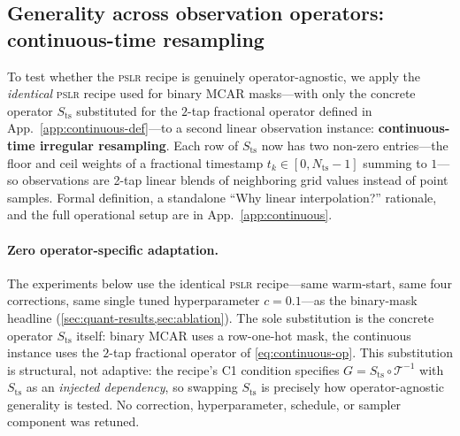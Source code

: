 \documentclass{article}
\theoremstyle{plain}
\theoremstyle{definition}
\theoremstyle{remark}
\newcommand{\imgts}{\mathcal{T}^{-1}}
\newcommand{\pslr}{\textsc{pslr}}
\newcommand{\Nts}{N_{\mathrm{ts}}}
\begin{document}
\vspace{-1mm}
\subsection{Generality across observation operators: continuous-time resampling}
\label{sec:continuous-operator}
\vspace{-1mm}

To test whether the \pslr{} recipe is genuinely operator-agnostic, we apply the \emph{identical} \pslr{} recipe used for binary MCAR masks---with only the concrete operator $S_{\mathrm{ts}}$ substituted for the $2$-tap fractional operator defined in App.~\ref{app:continuous-def}---to a second linear observation instance: \textbf{continuous-time irregular resampling}. Each row of $S_{\mathrm{ts}}$ now has two non-zero entries---the floor and ceil weights of a fractional timestamp $t_k \in [0, \Nts{-}1]$ summing to $1$---so observations are 2-tap linear blends of neighboring grid values instead of point samples. Formal definition, a standalone ``Why linear interpolation?'' rationale, and the full operational setup are in App.~\ref{app:continuous}.

\paragraph{Zero operator-specific adaptation.}
The experiments below use the identical \pslr{} recipe---same warm-start, same four corrections, same single tuned hyperparameter $c = 0.1$---as the binary-mask headline (\cref{sec:quant-results,sec:ablation}). The sole substitution is the concrete operator $S_{\mathrm{ts}}$ itself: binary MCAR uses a row-one-hot mask, the continuous instance uses the $2$-tap fractional operator of \cref{eq:continuous-op}. This substitution is structural, not adaptive: the recipe's C1 condition specifies $G = S_{\mathrm{ts}} \circ \imgts$ with $S_{\mathrm{ts}}$ as an \emph{injected dependency}, so swapping $S_{\mathrm{ts}}$ is precisely how operator-agnostic generality is tested. No correction, hyperparameter, schedule, or sampler component was retuned.
\end{document}
